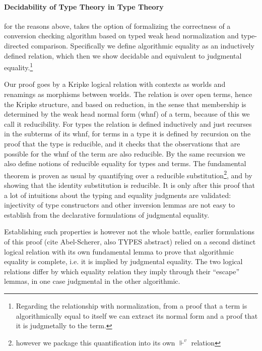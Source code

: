\documentclass{book}
\begin{document}
\paragraph{Decidability of Type Theory in Type Theory} for the reasons above,
takes the option of formalizing the correctness of a conversion
checking algorithm based on typed weak head normalization and
type-directed comparison. Specifically we define algorithmic equality
as an inductively defined relation, which then we show decidable and
equivalent to judgmental equality.\footnote{Regarding the relationship with
normalization, from a proof that a term is algorithmically equal to
itself we can extract its normal form and a
proof that it is judgmetally to the term.}

Our proof goes by a Kripke logical relation with contexts as worlds
and renamings as morphisms between worlds. The relation is over open
terms, hence the Kripke structure, and based on reduction, in the
sense that membership is determined by the weak head normal form
(whnf) of a term, because of this we call it reducibility. For types
the relation is defined inductively and just recurses in the subterms
of its whnf, for terms in a type it is defined by recursion on the
proof that the type is reducible, and it checks that the observations
that are possible for the whnf of the term are also reducible. By the
same recursion we also define notions of reducible equality for types
and terms. The fundamental theorem is proven as usual by quantifying
over a reducible substitution\footnote{however we package this
  quantification into its own $\Vdash^v$ relation}, and by showing
that the identity substitution is reducible. It is only after this
proof that a lot of intuitions about the typing and equality judgments
are validated: injectivity of type constructors and other inversion
lemmas are not easy to establish from the declarative formulations of
judgmental equality.

Establishing such properties is however not the whole battle, earlier
formulations of this proof (cite Abel-Scherer, also TYPES abstract)
relied on a second distinct logical relation with its own fundamental
lemma to prove that algorithmic equality is complete, i.e. it is
implied by judgmental equality. The two logical relations differ by
which equality relation they imply through their ``escape'' lemmas, in one
case judgmental in the other algorithmic.
\end{document}
